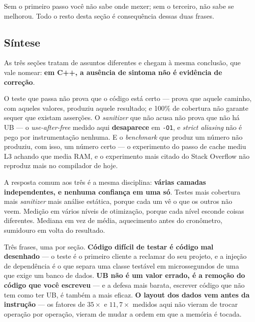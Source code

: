\begin{regra}
Sem o primeiro passo você não sabe onde mexer; sem o terceiro, não sabe se
melhorou. Todo o resto desta seção é consequência dessas duas frases.
\end{regra}

\subsection{Síntese}

As três seções tratam de assuntos diferentes e chegam à mesma conclusão, que vale
nomear: \textbf{em C++, a ausência de sintoma não é evidência de correção}.

O teste que passa não prova que o código está certo --- prova que aquele caminho,
com aqueles valores, produziu aquele resultado; e 100\% de cobertura não garante
sequer que existam asserções. O \emph{sanitizer} que não acusa não prova que não
há UB --- o \emph{use-after-free} medido aqui \textbf{desaparece} em \texttt{-O1},
e \emph{strict aliasing} não é pego por instrumentação nenhuma. E o
\emph{benchmark} que produz um número não produziu, com isso, um número certo ---
o experimento do passo de cache mediu L3 achando que media RAM, e o experimento
mais citado do Stack Overflow não reproduz mais no compilador de hoje.

A resposta comum aos três é a mesma disciplina: \textbf{várias camadas
independentes, e nenhuma confiança em uma só}. Testes mais cobertura mais
\emph{sanitizer} mais análise estática, porque cada um vê o que os outros não
veem. Medição em vários níveis de otimização, porque cada nível esconde coisas
diferentes. Mediana em vez de média, aquecimento antes do cronômetro, sumidouro em
volta do resultado.

\begin{regra}
Três frases, uma por seção. \textbf{Código difícil de testar é código mal
desenhado} --- o teste é o primeiro cliente a reclamar do seu projeto, e a injeção
de dependência é o que separa uma classe testável em microssegundos de uma que
exige um banco de dados. \textbf{UB não é um valor errado, é a remoção do código
que você escreveu} --- e a defesa mais barata, escrever código que não tem como ter
UB, é também a mais eficaz. \textbf{O layout dos dados vem antes da instrução} ---
os fatores de $35\times$ e $11{,}7\times$ medidos aqui não vieram de trocar
operação por operação, vieram de mudar a ordem em que a memória é tocada.
\end{regra}
